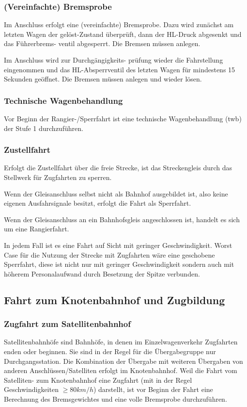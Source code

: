 \subsubsection{(Vereinfachte) Bremsprobe}\label{sec:vBremsprobe}
Im Anschluss erfolgt eine (vereinfachte) \gls{Bremsprobe}. Dazu wird zunächst am letzten Wagen der gelöst-Zustand überprüft, dann der \acrshort{HL}-Druck abgesenkt und das Führerbrems- ventil abgesperrt. Die Bremsen müssen anlegen.\par
Im Anschluss wird zur Durchgängigkeits- prüfung wieder die Fahrstellung eingenommen und das \acrshort{HL}-Absperrventil des letzten Wagen für mindestens 15 Sekunden geöffnet. Die Bremsen müssen anlegen und wieder lösen.
\subsubsection{Technische Wagenbehandlung}\label{sec:tWb}
Vor Beginn der Rangier-/\gls{Sperrfahrt} ist eine technische Wagenbehandlung (\acrshort{twb}) der Stufe 1 %
durchzuführen. 
\subsubsection{Zustellfahrt}\label{sec:Zustellfahrt}
Erfolgt die Zustellfahrt über die freie Strecke, ist das Streckengleis durch das Stellwerk für \gls{Zugfahrt}en zu sperren.\par
Wenn der Gleisanschluss selbst nicht als Bahnhof ausgebildet ist, also keine eigenen Ausfahrsignale besitzt, erfolgt die Fahrt als \gls{Sperrfahrt}.\par
Wenn der \gls{Gleisanschluss} an ein Bahnhofsgleis angeschlossen ist, handelt es sich um eine \gls{Rangierfahrt}.\par
In jedem Fall ist es eine Fahrt auf Sicht mit geringer Geschwindigkeit. Worst Case für die Nutzung der Strecke mit \gls{Zugfahrt}en wäre eine geschobene \gls{Sperrfahrt}, diese ist nicht nur mit geringer Geschwindigkeit sondern auch mit höherem Personalaufwand durch Besetzung der Spitze verbunden.

\subsection{Fahrt zum Knotenbahnhof und Zugbildung}
\subsubsection{Zugfahrt zum Satellitenbahnhof}\label{sec:Zugfahrt}
Satellitenbahnhöfe sind Bahnhöfe, in denen im Einzelwagenverkehr \gls{Zugfahrt}en enden oder beginnen. Sie sind in der Regel für die Übergabegruppe nur Durchgangsstation. Die Kombination der Übergabe mit weiteren Übergaben von anderen Anschlüssen/Satelliten erfolgt im \gls{Knotenbahnhof}. Weil die Fahrt vom Satelliten- zum \gls{Knotenbahnhof} eine \gls{Zugfahrt} (mit in der Regel Geschwindigkeiten $\ge 80 km/h$) darstellt, ist vor Beginn der Fahrt eine Berechnung des Bremsgewichtes und eine volle \gls{Bremsprobe} durchzuführen.%
